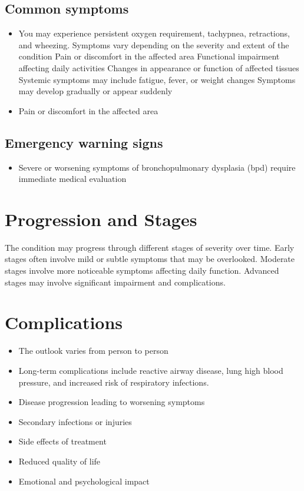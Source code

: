 \subsection{Common symptoms}
\begin{itemize}[noitemsep]
  \item You may experience persistent oxygen requirement, tachypnea, retractions, and wheezing. Symptoms vary depending on the severity and extent of the condition Pain or discomfort in the affected area Functional impairment affecting daily activities Changes in appearance or function of affected tissues Systemic symptoms may include fatigue, fever, or weight changes Symptoms may develop gradually or appear suddenly
  \item Pain or discomfort in the affected area
  \end{itemize}

\subsection{Emergency warning signs}
\begin{itemize}[noitemsep]
  \item Severe or worsening symptoms of bronchopulmonary dysplasia (bpd) require immediate medical evaluation
\end{itemize}
\section{Progression and Stages}
The condition may progress through different stages of severity over time. Early stages often involve mild or subtle symptoms that may be overlooked. Moderate stages involve more noticeable symptoms affecting daily function. Advanced stages may involve significant impairment and complications.
\section{Complications}
\begin{itemize}[noitemsep]
  \item The outlook varies from person to person
  \item Long-term complications include reactive airway disease, lung high blood pressure, and increased risk of respiratory infections.
  \item Disease progression leading to worsening symptoms
  \item Secondary infections or injuries
  \item Side effects of treatment
  \item Reduced quality of life
  \item Emotional and psychological impact
\end{itemize}
